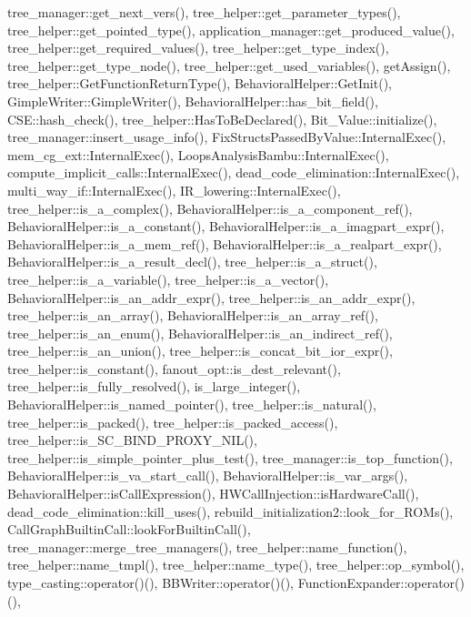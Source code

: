 tree\+\_\+manager\+::get\+\_\+next\+\_\+vers(), tree\+\_\+helper\+::get\+\_\+parameter\+\_\+types(), tree\+\_\+helper\+::get\+\_\+pointed\+\_\+type(), application\+\_\+manager\+::get\+\_\+produced\+\_\+value(), tree\+\_\+helper\+::get\+\_\+required\+\_\+values(), tree\+\_\+helper\+::get\+\_\+type\+\_\+index(), tree\+\_\+helper\+::get\+\_\+type\+\_\+node(), tree\+\_\+helper\+::get\+\_\+used\+\_\+variables(), get\+Assign(), tree\+\_\+helper\+::\+Get\+Function\+Return\+Type(), Behavioral\+Helper\+::\+Get\+Init(), Gimple\+Writer\+::\+Gimple\+Writer(), Behavioral\+Helper\+::has\+\_\+bit\+\_\+field(), C\+S\+E\+::hash\+\_\+check(), tree\+\_\+helper\+::\+Has\+To\+Be\+Declared(), Bit\+\_\+\+Value\+::initialize(), tree\+\_\+manager\+::insert\+\_\+usage\+\_\+info(), Fix\+Structs\+Passed\+By\+Value\+::\+Internal\+Exec(), mem\+\_\+cg\+\_\+ext\+::\+Internal\+Exec(), Loops\+Analysis\+Bambu\+::\+Internal\+Exec(), compute\+\_\+implicit\+\_\+calls\+::\+Internal\+Exec(), dead\+\_\+code\+\_\+elimination\+::\+Internal\+Exec(), multi\+\_\+way\+\_\+if\+::\+Internal\+Exec(), I\+R\+\_\+lowering\+::\+Internal\+Exec(), tree\+\_\+helper\+::is\+\_\+a\+\_\+complex(), Behavioral\+Helper\+::is\+\_\+a\+\_\+component\+\_\+ref(), Behavioral\+Helper\+::is\+\_\+a\+\_\+constant(), Behavioral\+Helper\+::is\+\_\+a\+\_\+imagpart\+\_\+expr(), Behavioral\+Helper\+::is\+\_\+a\+\_\+mem\+\_\+ref(), Behavioral\+Helper\+::is\+\_\+a\+\_\+realpart\+\_\+expr(), Behavioral\+Helper\+::is\+\_\+a\+\_\+result\+\_\+decl(), tree\+\_\+helper\+::is\+\_\+a\+\_\+struct(), tree\+\_\+helper\+::is\+\_\+a\+\_\+variable(), tree\+\_\+helper\+::is\+\_\+a\+\_\+vector(), Behavioral\+Helper\+::is\+\_\+an\+\_\+addr\+\_\+expr(), tree\+\_\+helper\+::is\+\_\+an\+\_\+addr\+\_\+expr(), tree\+\_\+helper\+::is\+\_\+an\+\_\+array(), Behavioral\+Helper\+::is\+\_\+an\+\_\+array\+\_\+ref(), tree\+\_\+helper\+::is\+\_\+an\+\_\+enum(), Behavioral\+Helper\+::is\+\_\+an\+\_\+indirect\+\_\+ref(), tree\+\_\+helper\+::is\+\_\+an\+\_\+union(), tree\+\_\+helper\+::is\+\_\+concat\+\_\+bit\+\_\+ior\+\_\+expr(), tree\+\_\+helper\+::is\+\_\+constant(), fanout\+\_\+opt\+::is\+\_\+dest\+\_\+relevant(), tree\+\_\+helper\+::is\+\_\+fully\+\_\+resolved(), is\+\_\+large\+\_\+integer(), Behavioral\+Helper\+::is\+\_\+named\+\_\+pointer(), tree\+\_\+helper\+::is\+\_\+natural(), tree\+\_\+helper\+::is\+\_\+packed(), tree\+\_\+helper\+::is\+\_\+packed\+\_\+access(), tree\+\_\+helper\+::is\+\_\+\+S\+C\+\_\+\+B\+I\+N\+D\+\_\+\+P\+R\+O\+X\+Y\+\_\+\+N\+I\+L(), tree\+\_\+helper\+::is\+\_\+simple\+\_\+pointer\+\_\+plus\+\_\+test(), tree\+\_\+manager\+::is\+\_\+top\+\_\+function(), Behavioral\+Helper\+::is\+\_\+va\+\_\+start\+\_\+call(), Behavioral\+Helper\+::is\+\_\+var\+\_\+args(), Behavioral\+Helper\+::is\+Call\+Expression(), H\+W\+Call\+Injection\+::is\+Hardware\+Call(), dead\+\_\+code\+\_\+elimination\+::kill\+\_\+uses(), rebuild\+\_\+initialization2\+::look\+\_\+for\+\_\+\+R\+O\+Ms(), Call\+Graph\+Builtin\+Call\+::look\+For\+Builtin\+Call(), tree\+\_\+manager\+::merge\+\_\+tree\+\_\+managers(), tree\+\_\+helper\+::name\+\_\+function(), tree\+\_\+helper\+::name\+\_\+tmpl(), tree\+\_\+helper\+::name\+\_\+type(), tree\+\_\+helper\+::op\+\_\+symbol(), type\+\_\+casting\+::operator()(), B\+B\+Writer\+::operator()(), Function\+Expander\+::operator()(), 